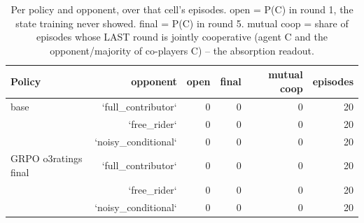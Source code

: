 \begin{table}[t]
\centering
\caption{Per policy and opponent, over that cell's episodes. open = P(C) in round 1, the state training never showed. final = P(C) in round 5. mutual coop = share of episodes whose LAST round is jointly cooperative (agent C and the opponent/majority of co-players C) -- the absorption readout.}
\label{tab:mr-outcomes}
\small
\setlength{\tabcolsep}{3.5pt}
\begin{tabular}{lrrrrr}
\toprule
Policy & opponent & open & final & mutual coop & episodes \\
\midrule
base & `full_contributor` & 0 & 0 & 0 & 20 \\
 & `free_rider` & 0 & 0 & 0 & 20 \\
 & `noisy_conditional` & 0 & 0 & 0 & 20 \\
GRPO o3ratings final & `full_contributor` & 0 & 0 & 0 & 20 \\
 & `free_rider` & 0 & 0 & 0 & 20 \\
 & `noisy_conditional` & 0 & 0 & 0 & 20 \\
\bottomrule
\end{tabular}
\end{table}
